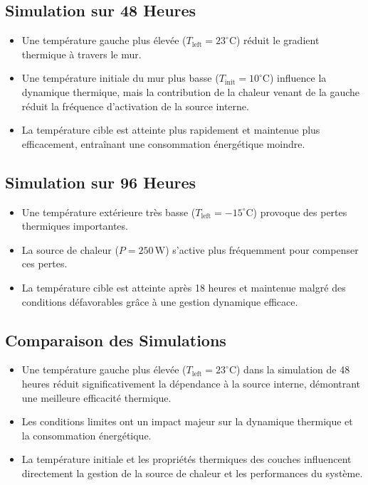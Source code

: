 \documentclass[a4paper,11pt]{article}
\begin{document}
\subsection{Simulation sur 48 Heures}

\begin{itemize}
    \item Une température gauche plus élevée (\(T_{\text{left}} = 23^\circ\mathrm{C}\)) réduit le gradient thermique à travers le mur.
    \item Une température initiale du mur plus basse (\(T_{\text{init}} = 10^\circ\mathrm{C}\)) influence la dynamique thermique, mais la contribution de la chaleur venant de la gauche réduit la fréquence d'activation de la source interne.
    \item La température cible est atteinte plus rapidement et maintenue plus efficacement, entraînant une consommation énergétique moindre.
\end{itemize}

\subsection{Simulation sur 96 Heures}

\begin{itemize}
    \item Une température extérieure très basse (\(T_{\text{left}} = -15^\circ\mathrm{C}\)) provoque des pertes thermiques importantes.
    \item La source de chaleur (\(P = 250\,\mathrm{W}\)) s'active plus fréquemment pour compenser ces pertes.
    \item La température cible est atteinte après 18 heures et maintenue malgré des conditions défavorables grâce à une gestion dynamique efficace.
\end{itemize}

\subsection{Comparaison des Simulations}

\begin{itemize}
    \item Une température gauche plus élevée (\(T_{\text{left}} = 23^\circ\mathrm{C}\)) dans la simulation de 48 heures réduit significativement la dépendance à la source interne, démontrant une meilleure efficacité thermique.
    \item Les conditions limites ont un impact majeur sur la dynamique thermique et la consommation énergétique.
    \item La température initiale et les propriétés thermiques des couches influencent directement la gestion de la source de chaleur et les performances du système.
\end{itemize}
\end{document}
